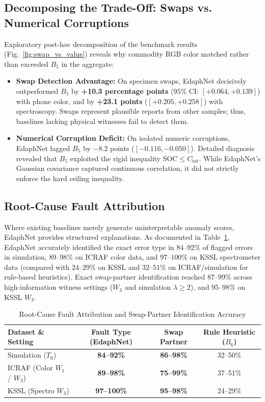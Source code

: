 \documentclass[journal,twoside]{IEEEtran}
\begin{document}
\subsection{Decomposing the Trade-Off: Swaps vs. Numerical Corruptions}
Exploratory post-hoc decomposition of the benchmark results (Fig.~\ref{fig:swap_vs_value}) reveals why commodity RGB color matched rather than exceeded $B_5$ in the aggregate:
\begin{itemize}
    \item \textbf{Swap Detection Advantage:} On specimen swaps, EdaphNet decisively outperformed $B_5$ by \textbf{+10.3 percentage points} ($95\%$ CI: $[+0.064, +0.139]$) with phone color, and by \textbf{+23.1 points} ($[+0.205, +0.258]$) with spectroscopy. Swaps represent plausible reports from other samples; thus, baselines lacking physical witnesses fail to detect them.
    \item \textbf{Numerical Corruption Deficit:} On isolated numeric corruptions, EdaphNet lagged $B_5$ by $-8.2$ points ($[-0.116, -0.050]$). Detailed diagnosis revealed that $B_5$ exploited the rigid inequality $\text{SOC} \le C_{\text{tot}}$. While EdaphNet's Gaussian covariance captured continuous correlation, it did not strictly enforce the hard ceiling inequality.
\end{itemize}

\subsection{Root-Cause Fault Attribution}
Where existing baselines merely generate uninterpretable anomaly scores, EdaphNet provides structured explanations. As documented in Table~\ref{tab:attribution}, EdaphNet accurately identified the exact error type in $84\text{--}92\%$ of flagged errors in simulation, $89\text{--}98\%$ on ICRAF color data, and $97\text{--}100\%$ on KSSL spectrometer data (compared with $24\text{--}29\%$ on KSSL and $32\text{--}51\%$ on ICRAF/simulation for rule-based heuristics). Exact swap-partner identification reached $87\text{--}99\%$ across high-information witness settings ($W_3$ and simulation $\lambda \ge 2$), and $95\text{--}98\%$ on KSSL $W_3$.

\begin{table}[!t]
\centering
\caption{Root-Cause Fault Attribution and Swap-Partner Identification Accuracy}
\label{tab:attribution}
\begin{tabular}{lccc}
\toprule
\textbf{Dataset \& Setting} & \textbf{Fault Type (EdaphNet)} & \textbf{Swap Partner} & \textbf{Rule Heuristic ($B_6$)} \\
\midrule
Simulation ($T_0$) & \textbf{84--92\%} & \textbf{86--98\%} & 32--50\% \\
ICRAF (Color $W_1$ / $W_3$) & \textbf{89--98\%} & \textbf{75--99\%} & 37--51\% \\
KSSL (Spectro $W_3$) & \textbf{97--100\%} & \textbf{95--98\%} & 24--29\% \\
\bottomrule
\end{tabular}
\end{table}
\end{document}
